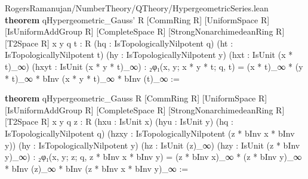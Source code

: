 \documentclass[12pt]{amsart}
\theoremstyle{definition}
\theoremstyle{remark}
\numberwithin{equation}{subsection}
\newcommand{\kw}[1]{\textcolor{keywordcolor}{\textbf{#1}}}
\newcommand{\var}[1]{\textcolor{tacticcolor}{#1}}
\newcommand{\imp}[1]{\textcolor{commentcolor}{\textbraceleft#1\textbraceright}}
\begin{document}
\begin{code}{RogersRamanujan/NumberTheory/QTheory/HypergeometricSeries.lean}
\kw{theorem} qHypergeometric_Gauss' \imp{R} [CommRing \var{R}] [UniformSpace \var{R}]
  [IsUniformAddGroup \var{R}] [CompleteSpace \var{R}] [StrongNonarchimedeanRing \var{R}] [T2Space \var{R}]
  \imp{x y q t : R} (\var{hq} : IsTopologicallyNilpotent \var{q}) (\var{ht} : IsTopologicallyNilpotent \var{t})
  (\var{hy} : IsTopologicallyNilpotent \var{y})
  (\var{hxt} : IsUnit (\var{x} * \var{t})_∞) (\var{hxyt} : IsUnit (\var{x} * \var{y} * \var{t})_∞) :
  ₂φ₁(\var{x}, \var{y}; \var{x} * \var{y} * \var{t}; \var{q}, \var{t}) = (\var{x} * \var{t})_∞ * (\var{y} * \var{t})_∞ * bInv (\var{x} * \var{y} * \var{t})_∞ * bInv (\var{t})_∞ :=

\kw{theorem} qHypergeometric_Gauss \imp{R} [CommRing \var{R}] [UniformSpace \var{R}]
  [IsUniformAddGroup \var{R}] [CompleteSpace \var{R}] [StrongNonarchimedeanRing \var{R}] [T2Space \var{R}]
  \imp{x y q z : R} (\var{hxu} : IsUnit \var{x}) (\var{hyu} : IsUnit \var{y})
  (\var{hq} : IsTopologicallyNilpotent \var{q})
  (\var{hzxy} : IsTopologicallyNilpotent (\var{z} * bInv \var{x} * bInv \var{y}))
  (\var{hy} : IsTopologicallyNilpotent \var{y})
  (\var{hz} : IsUnit (\var{z})_∞) (\var{hzy} : IsUnit (\var{z} * bInv \var{y})_∞) :
  ₂φ₁(\var{x}, \var{y}; \var{z}; \var{q}, \var{z} * bInv \var{x} * bInv \var{y}) =
    (\var{z} * bInv \var{x})_∞ * (\var{z} * bInv \var{y})_∞ * bInv (\var{z})_∞ * bInv (\var{z} * bInv \var{x} * bInv \var{y})_∞ :=
\end{code}
\end{document}
